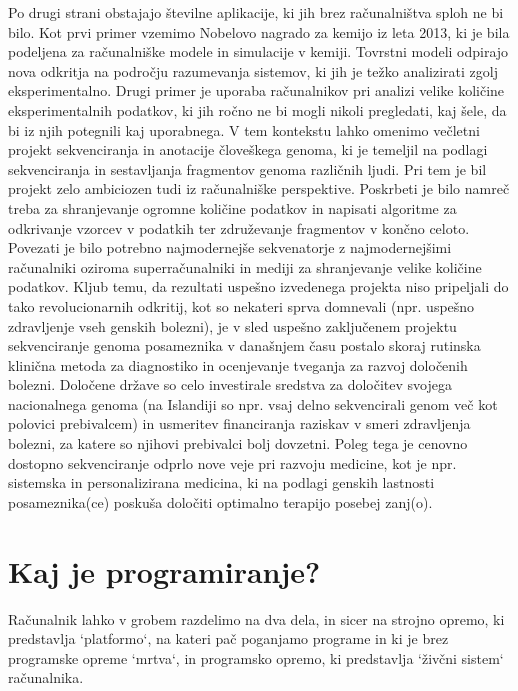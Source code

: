Po drugi strani obstajajo številne aplikacije, ki jih brez računalništva sploh ne bi bilo. Kot prvi primer vzemimo Nobelovo nagrado za kemijo iz leta 2013, ki je bila podeljena za računalniške modele in simulacije v kemiji. Tovrstni modeli odpirajo nova odkritja na področju razumevanja sistemov, ki jih je težko analizirati zgolj eksperimentalno. Drugi primer je uporaba računalnikov pri analizi velike količine eksperimentalnih podatkov, ki jih ročno ne bi mogli nikoli pregledati, kaj šele, da bi iz njih potegnili kaj uporabnega. V tem kontekstu lahko omenimo večletni projekt sekvenciranja in anotacije človeškega genoma, ki je temeljil na podlagi sekvenciranja in sestavljanja fragmentov genoma različnih ljudi. Pri tem je bil projekt zelo ambiciozen tudi iz računalniške perspektive. Poskrbeti je bilo namreč treba za shranjevanje ogromne količine podatkov in napisati algoritme za odkrivanje vzorcev v podatkih ter združevanje fragmentov v končno celoto. Povezati je bilo potrebno najmodernejše sekvenatorje z najmodernejšimi računalniki oziroma superračunalniki in mediji za shranjevanje velike količine podatkov. Kljub temu, da rezultati uspešno izvedenega projekta niso pripeljali do tako revolucionarnih odkritij, kot so nekateri sprva domnevali (npr. uspešno zdravljenje vseh genskih bolezni), je v sled uspešno zaključenem projektu sekvenciranje genoma posameznika v današnjem času postalo skoraj rutinska klinična metoda za diagnostiko in ocenjevanje tveganja za razvoj določenih bolezni. Določene države so celo investirale sredstva za določitev svojega nacionalnega genoma (na Islandiji so npr. vsaj delno sekvencirali genom več kot polovici prebivalcem) in usmeritev financiranja raziskav v smeri zdravljenja bolezni, za katere so njihovi prebivalci bolj dovzetni. Poleg tega je cenovno dostopno sekvenciranje odprlo nove veje pri razvoju medicine, kot je npr. sistemska in personalizirana medicina, ki na podlagi genskih lastnosti posameznika(ce) poskuša določiti optimalno terapijo posebej zanj(o).

\section{Kaj je programiranje?}

Računalnik lahko v grobem razdelimo na dva dela, in sicer na strojno opremo, ki predstavlja `platformo`, na kateri pač poganjamo programe in ki je brez programske opreme `mrtva`, in programsko opremo, ki predstavlja `živčni sistem` računalnika. %

